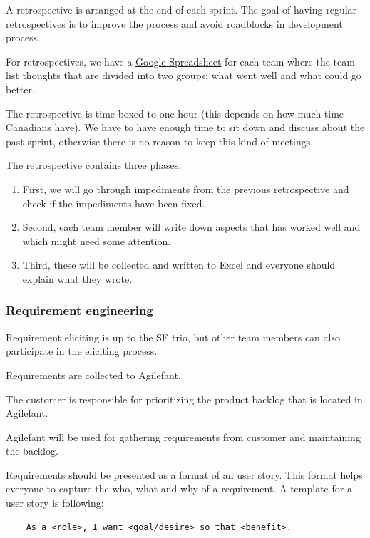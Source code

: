 A retrospective is arranged at the end of each sprint. The goal of having regular retrospectives is to improve the process and avoid roadblocks in development process.

For retrospectives, we have a \href{https://docs.google.com/spreadsheet/ccc?key=0Ahu59q_GwtcedGE1dnZtTHNzRDZ4YWR5aXp3NDhMcnc&usp=sharing}{Google Spreadsheet} for each team where the team list thoughts that are divided into two groups: what went well and what could go better. 

The retrospective is time-boxed to one hour (this depends on how much time Canadians have). We have to have enough time to sit down and discuss about the past sprint, otherwise there is no reason to keep this kind of meetings. 

The retrospective contains three phases:

\begin{enumerate}
\item First, we will go through impediments from the previous 
retrospective and check if the impediments have been fixed.
\item Second, each team member will write down aspects that has 
worked well and which might need some attention.
\item Third, these will be collected and written to Excel and 
everyone should explain what they wrote.
\end{enumerate}

\subsubsection{Requirement engineering}

Requirement eliciting is up to the SE trio, but other team members can also participate in the eliciting process.

Requirements are collected to Agilefant. 

The customer is responsible for prioritizing the product backlog that is located in Agilefant.

Agilefant will be used for gathering requirements from customer and maintaining 
the backlog. 

Requirements should be presented as a format of an user story. This format helps everyone to capture the who, what and why of a requirement. A template for a user story is following:

\begin{verbatim}
    As a <role>, I want <goal/desire> so that <benefit>.
\end{verbatim}


